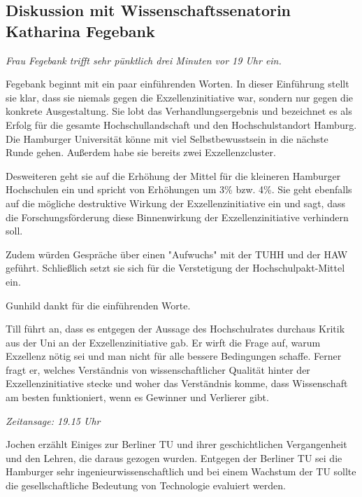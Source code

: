 \documentclass[ngerman,headheight=70pt]{scrartcl}
\begin{document}

    \subsection{Diskussion mit Wissenschaftssenatorin Katharina Fegebank}

    \textit{Frau Fegebank trifft sehr pünktlich drei Minuten vor 19 Uhr ein.}

    Fegebank beginnt mit ein paar einführenden Worten. In dieser Einführung
    stellt sie klar, dass sie niemals gegen die Exzellenzinitiative war, sondern
    nur gegen die konkrete Ausgestaltung. Sie lobt das Verhandlungsergebnis
    und bezeichnet es als Erfolg für die gesamte Hochschullandschaft und den
    Hochschulstandort Hamburg. Die Hamburger Universität könne mit viel
    Selbstbewusstsein in die nächste Runde gehen. Außerdem habe sie bereits
    zwei Exzellenzcluster.

    Desweiteren geht sie auf die Erhöhung der Mittel für die kleineren
    Hamburger Hochschulen ein und spricht von Erhöhungen um 3\% bzw. 4\%.
    Sie geht ebenfalls auf die mögliche destruktive Wirkung der Exzellenzinitiative
    ein und sagt, dass die Forschungsförderung diese Binnenwirkung der
    Exzellenzinitiative verhindern soll.

    Zudem würden Gespräche über einen "Aufwuchs" mit der TUHH und der HAW geführt.
    Schließlich setzt sie sich für die Verstetigung der Hochschulpakt-Mittel ein.

    Gunhild dankt für die einführenden Worte.

    Till führt an, dass es entgegen der Aussage des Hochschulrates durchaus
    Kritik aus der Uni an der Exzellenzinitiative gab. Er wirft die Frage auf,
    warum Exzellenz nötig sei und man nicht für alle bessere Bedingungen schaffe.
    Ferner fragt er, welches Verständnis von wissenschaftlicher Qualität hinter
    der Exzellenzinitiative stecke und woher das Verständnis komme, dass
    Wissenschaft am besten funktioniert, wenn es Gewinner und Verlierer gibt.

    \textit{Zeitansage: 19.15 Uhr}

    Jochen erzählt Einiges zur Berliner TU und ihrer geschichtlichen Vergangenheit
    und den Lehren, die daraus gezogen wurden. Entgegen der Berliner TU sei die
    Hamburger sehr ingenieurwissenschaftlich und bei einem Wachstum der TU sollte
    die gesellschaftliche Bedeutung von Technologie evaluiert werden.
\end{document}
